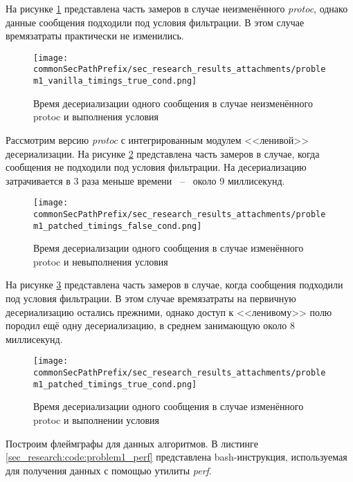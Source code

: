 На рисунке \ref{fig:problem1_vanilla_timings_true_cond} представлена часть замеров в случае неизменённого \textit{protoc}, однако данные сообщения подходили под условия фильтрации. В этом случае времязатраты практически не изменились.

\begin{figure}[H]
    \centering
    \texttt{[image: \\commonSecPathPrefix/sec\_research\_results\_attachments/problem1\_vanilla\_timings\_true\_cond.png]}
    \caption{Время десериализации одного сообщения в случае неизменённого protoc и выполнения условия}
    \label{fig:problem1_vanilla_timings_true_cond}
\end{figure}

Рассмотрим версию \textit{protoc} с интегрированным модулем <<ленивой>> десериализации.
На рисунке \ref{fig:problem1_patched_timings_false_cond} представлена часть замеров в случае, когда сообщения не подходили под условия фильтрации. На десериализацию затрачивается в 3 раза меньше времени ~--~ около 9 миллисекунд.

\begin{figure}[H]
    \centering
    \texttt{[image: \\commonSecPathPrefix/sec\_research\_results\_attachments/problem1\_patched\_timings\_false\_cond.png]}
    \caption{Время десериализации одного сообщения в случае изменённого protoc и невыполнения условия}
    \label{fig:problem1_patched_timings_false_cond}
\end{figure}

На рисунке \ref{fig:problem1_patched_timings_true_cond} представлена часть замеров в случае, когда сообщения подходили под условия фильтрации. В этом случае времязатраты на первичную десериализацию остались прежними, однако доступ к <<ленивому>> полю породил ещё одну десериализацию, в среднем занимающую около 8 миллисекунд. 

\begin{figure}[H]
    \centering
    \texttt{[image: \\commonSecPathPrefix/sec\_research\_results\_attachments/problem1\_patched\_timings\_true\_cond.png]}
    \caption{Время десериализации одного сообщения в случае изменённого protoc и выполнении условия}
    \label{fig:problem1_patched_timings_true_cond}
\end{figure}

Построим флеймграфы для данных алгоритмов. В листинге \ref{sec_research:code:problem1_perf} представлена bash-инструкция, используемая для получения данных с помощью утилиты \textit{perf}.

